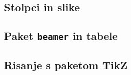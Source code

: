 \documentclass{beamer}
\theoremstyle{plain}
\begin{document}
\begin{frame}
    \section{Stolpci in slike}
\end{frame}



\begin{frame}
    \section{Paket \texttt{beamer} in tabele}
\end{frame}



\begin{frame}
    \section{Risanje s paketom TikZ}
\end{frame}


\end{document}
